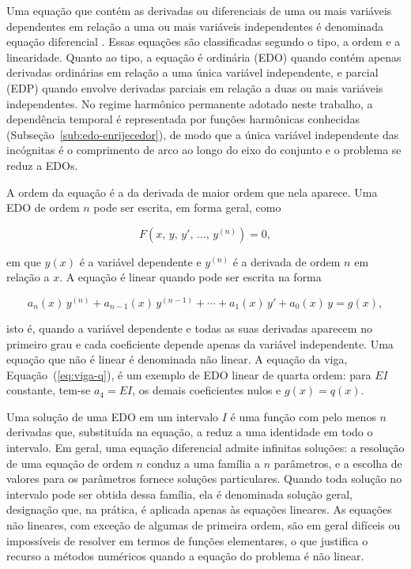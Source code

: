 \documentclass[arial,centeredequations,english,brazilian,oneside,section=TITLE]{ifes8}
\begin{document}
Uma equação que contém as derivadas ou diferenciais de uma ou mais variáveis
dependentes em relação a uma ou mais variáveis independentes é denominada equação
diferencial \cite{Zill2001v2}. Essas equações são classificadas segundo o tipo, a
ordem e a linearidade. Quanto ao tipo, a equação é ordinária (EDO) quando contém apenas
derivadas ordinárias em relação a uma única variável independente, e parcial (EDP)
quando envolve derivadas parciais em relação a duas ou mais variáveis independentes.
No regime harmônico permanente adotado neste trabalho, a
dependência temporal é representada por funções harmônicas conhecidas
(Subseção~\ref{sub:edo-enrijecedor}), de modo que a única variável independente das
incógnitas é o comprimento de arco ao longo do eixo do conjunto e o problema se reduz a
EDOs.
 
A ordem da equação é a da derivada de maior ordem que nela aparece.
Uma EDO de ordem $n$ pode ser escrita, em forma geral, como

\begin{equation}
  \label{eq:edo-geral}
  F\!\left(x,\, y,\, y',\, \ldots,\, y^{(n)}\right) = 0,
\end{equation}

em que $y(x)$ é a variável dependente e $y^{(n)}$ é a derivada de ordem $n$ em relação a
$x$. A equação é linear quando pode ser escrita na forma

\begin{equation}
  \label{eq:edo-linear-n}
  a_n(x)\,y^{(n)} + a_{n-1}(x)\,y^{(n-1)} + \cdots + a_1(x)\,y' + a_0(x)\,y = g(x),
\end{equation}

isto é, quando a variável dependente e todas as suas derivadas aparecem no primeiro grau
e cada coeficiente depende apenas da variável independente. Uma equação que não é linear
é denominada não linear. A equação da viga,
Equação~(\ref{eq:viga-q}), é um exemplo de EDO linear de quarta ordem: para $EI$
constante, tem-se $a_4 = EI$, os demais coeficientes nulos e $g(x) = q(x)$.
 
Uma solução de uma EDO em um intervalo $I$ é uma função com pelo menos $n$ derivadas
que, substituída na equação, a reduz a uma identidade em todo o intervalo.
Em geral, uma equação diferencial admite infinitas soluções:
a resolução de uma equação de ordem $n$ conduz a uma família a $n$ parâmetros, e a
escolha de valores para os parâmetros fornece soluções particulares.
Quando toda solução no intervalo pode ser obtida dessa
família, ela é denominada solução geral, designação que, na prática, é aplicada apenas
às equações lineares. As equações não lineares, com exceção de
algumas de primeira ordem, são em geral difíceis ou impossíveis de resolver em termos
de funções elementares, o que justifica o recurso a métodos
numéricos quando a equação do problema é não linear.
 
\end{document}
